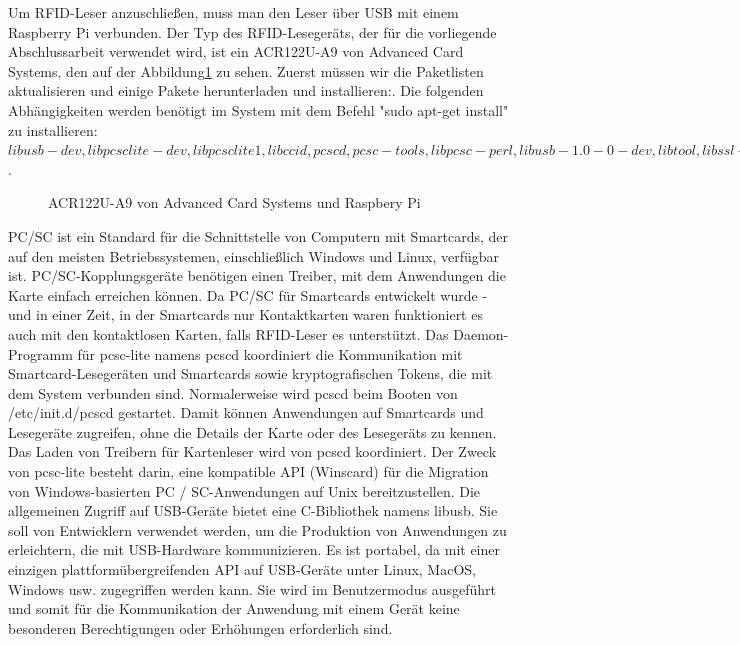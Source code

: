 Um RFID-Leser anzuschließen, muss man den Leser über USB mit einem Raspberry Pi verbunden. Der Typ des RFID-Lesegeräts, der für die vorliegende Abschlussarbeit verwendet wird, ist ein ACR122U-A9 von Advanced Card Systems\cite{website:7}, den auf der Abbildung\ref{fig:rfid_hard} zu sehen. Zuerst müssen wir die Paketlisten aktualisieren und einige Pakete herunterladen und installieren:\cite{website:6}. Die folgenden Abhängigkeiten werden benötigt im System mit dem Befehl "sudo apt-get install" zu installieren: $libusb-dev, libpcsclite-dev, libpcsclite1, libccid, pcscd, pcsc-tools, libpcsc-perl, libusb-1.0-0-dev, libtool, libssl-dev$.\\
\begin{figure}
	\caption{ACR122U-A9 von Advanced Card Systems und Raspbery Pi}
	\label{fig:rfid_hard}
\end{figure}
PC/SC ist ein Standard für die Schnittstelle von Computern mit Smartcards, der auf den meisten Betriebssystemen, einschließlich Windows und Linux, verfügbar ist. PC/SC-Kopplungsgeräte benötigen einen Treiber, mit dem Anwendungen die Karte einfach erreichen können. Da PC/SC für Smartcards entwickelt wurde - und in einer Zeit, in der Smartcards nur Kontaktkarten waren funktioniert es auch mit den kontaktlosen Karten, falls RFID-Leser es unterstützt. Das Daemon-Programm für pcsc-lite namens pcscd koordiniert die Kommunikation mit Smartcard-Lesegeräten und Smartcards sowie kryptografischen Tokens, die mit dem System verbunden sind. Normalerweise wird pcscd beim Booten von /etc/init.d/pcscd gestartet. Damit können Anwendungen auf Smartcards und Lesegeräte zugreifen, ohne die Details der Karte oder des Lesegeräts zu kennen. Das Laden von Treibern für Kartenleser wird von pcscd koordiniert. Der Zweck von pcsc-lite besteht darin, eine kompatible API (Winscard) für die Migration von Windows-basierten PC / SC-Anwendungen auf Unix bereitzustellen\cite{website:5}. Die allgemeinen Zugriff auf USB-Geräte bietet eine C-Bibliothek namens libusb.  Sie soll von Entwicklern verwendet werden, um die Produktion von Anwendungen zu erleichtern, die mit USB-Hardware kommunizieren. Es ist portabel, da mit einer einzigen plattformübergreifenden API auf USB-Geräte unter Linux, MacOS, Windows usw. zugegriffen werden kann. Sie wird im Benutzermodus ausgeführt und somit für die Kommunikation der Anwendung mit einem Gerät keine besonderen Berechtigungen oder Erhöhungen erforderlich sind.\cite{website:8}


